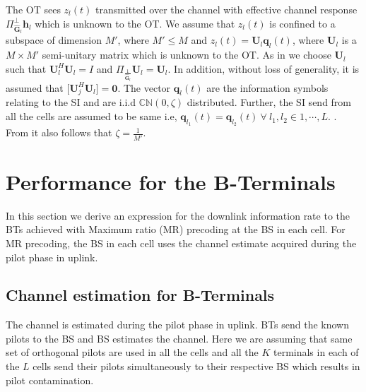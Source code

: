 \documentclass[10pt, a4paper, twoside,fleqn]{article}
\begin{document}
The OT sees $z_l(t)$ transmitted over the channel with effective channel response $\Pi^{\perp}_{\pmb{\hat{G}}_l}\pmb{h}_l$ which is unknown to the OT. We assume that $z_l(t)$ is confined to a subspace of dimension $M'$, where $M'\leq M$ and $z_l(t) = \pmb{U}_l\pmb{q}_l(t)$, where $\pmb{U}_l$ is a $M\times M'$ semi-unitary matrix which is unknown to the OT. As in \cite{bib:jbb} we choose $\pmb{U}_l$ such that $\pmb{U}_l^H\pmb{U}_l=I$ and $\Pi_{\frac{1}{\pmb{\hat G}_l}}\pmb{U}_l=\pmb{U}_l$. In addition, without loss of generality, it is assumed that [$\pmb{U}_j^H\pmb{U}_l]=\pmb{0}$. The vector $\pmb{q}_l(t)$ are the information symbols relating to the SI and are i.i.d ${\mathbb C}{\mathbb N}(0,\zeta)$ distributed. Further, the SI send from all the cells are assumed to be same i.e, $\pmb{q}_{l_1}(t) = \pmb{q}_{l_2}(t) \ \forall \ l_1,l_2 \in {1 , \cdots, L}$. . From \cite{bib:jbb} it also follows that $\zeta=\frac{1}{M'}$. 
\section{Performance for the B-Terminals}
In this section we derive an  expression for the downlink information rate to the BTs achieved with Maximum ratio (MR) precoding at the BS in each cell. For MR precoding, the BS in each cell uses the channel estimate acquired during the pilot phase in uplink.  

\subsection{Channel estimation for B-Terminals} \label{sec:btchesti}
	The channel is estimated during the pilot phase in uplink. BTs send the known pilots to the BS and BS estimates the channel. Here we are assuming that same set of orthogonal pilots are used in all the cells and all the $K$ terminals in each of the $L$ cells send their pilots simultaneously to their respective BS which results in pilot contamination.
\end{document}
